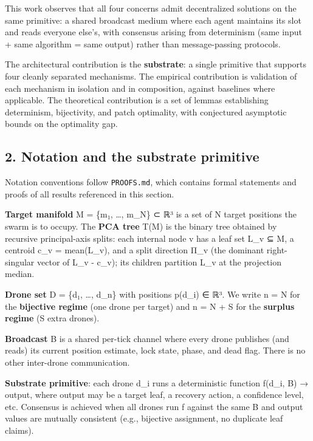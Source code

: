 This work observes that all four concerns admit decentralized solutions
on the same primitive: a shared broadcast medium where each agent
maintains its slot and reads everyone else's, with consensus arising
from determinism (same input + same algorithm = same output) rather than
message-passing protocols.

The architectural contribution is the \textbf{substrate}: a single
primitive that supports four cleanly separated mechanisms. The empirical
contribution is validation of each mechanism in isolation and in
composition, against baselines where applicable. The theoretical
contribution is a set of lemmas establishing determinism, bijectivity,
and patch optimality, with conjectured asymptotic bounds on the
optimality gap.

\subsection{2. Notation and the substrate
primitive}\label{notation-and-the-substrate-primitive}

Notation conventions follow \texttt{PROOFS.md}, which contains formal
statements and proofs of all results referenced in this section.

\textbf{Target manifold} M = \{m₁, \ldots, m\_N\} ⊂ ℝ³ is a set of N
target positions the swarm is to occupy. The \textbf{PCA tree} T(M) is
the binary tree obtained by recursive principal-axis splits: each
internal node v has a leaf set L\_v ⊆ M, a centroid c\_v = mean(L\_v),
and a split direction Π\_v (the dominant right-singular vector of L\_v -
c\_v); its children partition L\_v at the projection median.

\textbf{Drone set} D = \{d₁, \ldots, d\_n\} with positions p(d\_i) ∈ ℝ³.
We write n = N for the \textbf{bijective regime} (one drone per target)
and n = N + S for the \textbf{surplus regime} (S extra drones).

\textbf{Broadcast} B is a shared per-tick channel where every drone
publishes (and reads) its current position estimate, lock state, phase,
and dead flag. There is no other inter-drone communication.

\textbf{Substrate primitive}: each drone d\_i runs a deterministic
function f(d\_i, B) → output, where output may be a target leaf, a
recovery action, a confidence level, etc. Consensus is achieved when all
drones run f against the same B and output values are mutually
consistent (e.g., bijective assignment, no duplicate leaf claims).

